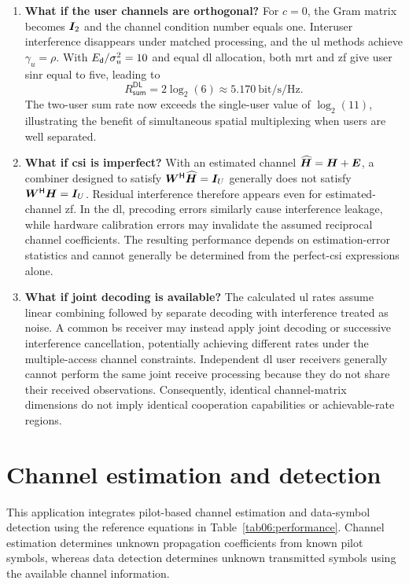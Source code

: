 \begin{enumerate}[label=\textbf{\arabic*.}]
	\item \textbf{What if the user channels are orthogonal?}
	For $c=0$, the Gram matrix becomes $\bm{I}_2$ and the channel condition number equals one. Interuser interference disappears under matched processing, and the \ac{ul} methods achieve $\gamma_u=\rho$. With $E_{\mathsf{d}}/\sigma_u^2=10$ and equal \ac{dl} allocation, both \ac{mrt} and \ac{zf} give user \ac{sinr} equal to five, leading to
	\begin{equation*}
		R_{\mathsf{sum}}^{\mathsf{DL}}
		=2\log_2(6)\approx5.170\ \text{bit/s/Hz}.
	\end{equation*}
	The two-user sum rate now exceeds the single-user value of $\log_2(11)$, illustrating the benefit of simultaneous spatial multiplexing when users are well separated.
	
	\item \textbf{What if \ac{csi} is imperfect?}
	With an estimated channel $\widehat{\bm{H}}=\bm{H}+\bm{E}$, a combiner designed to satisfy ${\bm{W}}^{\mathsf{H}}\widehat{\bm{H}}=\bm{I}_U$ generally does not satisfy ${\bm{W}}^{\mathsf{H}}\bm{H}=\bm{I}_U$. Residual interference therefore appears even for estimated-channel \ac{zf}. In the \ac{dl}, precoding errors similarly cause interference leakage, while hardware calibration errors may invalidate the assumed reciprocal channel coefficients. The resulting performance depends on estimation-error statistics and cannot generally be determined from the perfect-\ac{csi} expressions alone.
	
	\item \textbf{What if joint decoding is available?}
	The calculated \ac{ul} rates assume linear combining followed by separate decoding with interference treated as noise. A common \ac{bs} receiver may instead apply joint decoding or successive interference cancellation, potentially achieving different rates under the multiple-access channel constraints. Independent \ac{dl} user receivers generally cannot perform the same joint receive processing because they do not share their received observations. Consequently, identical channel-matrix dimensions do not imply identical cooperation capabilities or achievable-rate regions.
\end{enumerate}


\section{Channel estimation and detection}
\label{sec06:estimation}
This application integrates pilot-based channel estimation and data-symbol detection using the reference equations in Table~\ref{tab06:performance}. Channel estimation determines unknown propagation coefficients from known pilot symbols, whereas data detection determines unknown transmitted symbols using the available channel information.


